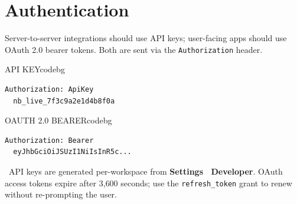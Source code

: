 \section{Authentication}
Server-to-server integrations should use API keys; user-facing apps should use OAuth 2.0
bearer tokens. Both are sent via the \texttt{Authorization} header.

\begin{minipage}[t]{0.48\textwidth}
\begin{jsonpanel}{API KEY}{codebg}
\begin{lstlisting}
Authorization: ApiKey
  nb_live_7f3c9a2e1d4b8f0a
\end{lstlisting}
\end{jsonpanel}
\end{minipage}\hfill
\begin{minipage}[t]{0.48\textwidth}
\begin{jsonpanel}{OAUTH 2.0 BEARER}{codebg}
\begin{lstlisting}
Authorization: Bearer
  eyJhbGciOiJSUzI1NiIsInR5c...
\end{lstlisting}
\end{jsonpanel}
\end{minipage}
\par

{\small\color{steel} \infoicon{\faLock}\ API keys are generated per-workspace from
\textbf{Settings \textrightarrow\ Developer}. OAuth access tokens expire after 3{,}600
seconds; use the \texttt{refresh\_token} grant to renew without re-prompting the user.}

